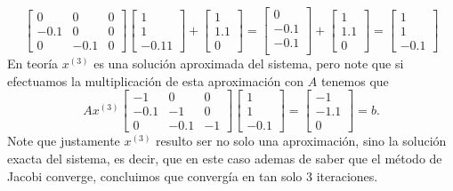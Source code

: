 \begin{enumerate}
\begin{solution}
$$\begin{bmatrix}
           0&0&0\\
           -0.1&0&0\\
           0&-0.1&0
       \end{bmatrix}\begin{bmatrix}
            1\\
            1\\
            -0.11
        \end{bmatrix}+\begin{bmatrix}
            1\\
            1.1\\
            0
            \end{bmatrix}=\begin{bmatrix}
           0\\
           -0.1\\
           -0.1\\
        \end{bmatrix}+\begin{bmatrix}
            1\\
            1.1\\
            0
        \end{bmatrix}=\begin{bmatrix}
            1\\
            1\\
            -0.1
        \end{bmatrix}$$
        En teoría $x^{(3)}$ es una solución aproximada del sistema, pero note que si efectuamos la multiplicación de esta aproximación con $A$ tenemos que
        $$Ax^{(3)}\begin{bmatrix}
           -1&0&0\\
           -0.1&-1&0\\
           0&-0.1&-1
       \end{bmatrix}\begin{bmatrix}
            1\\
            1\\
            -0.1
        \end{bmatrix}=\begin{bmatrix}
            -1\\
            -1.1\\
            0
        \end{bmatrix}=b.$$
        Note que justamente $x^{(3)}$ resulto ser no solo una aproximación, sino la solución exacta del sistema, es decir, que en este caso ademas de saber que el método de Jacobi converge, concluimos que convergía en tan solo 3 iteraciones.
        
    \end{solution}
\end{enumerate}